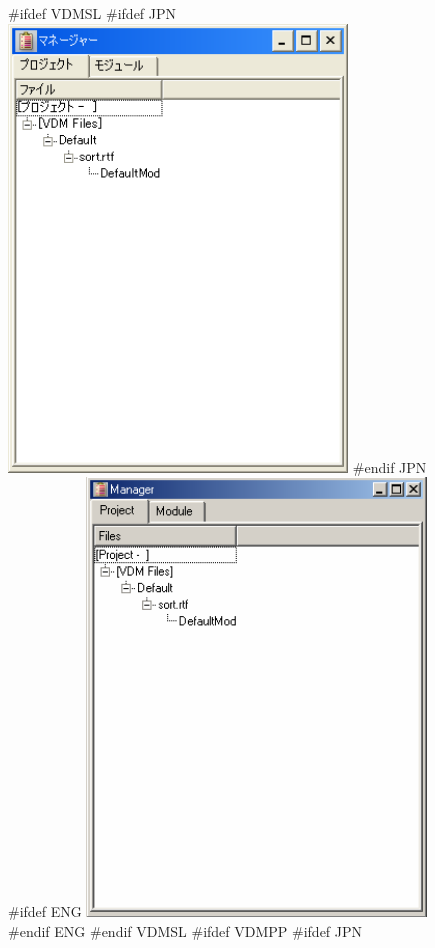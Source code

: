 \documentclass[\pformat,12pt]{article}
\begin{document}
\begin{figure}[tbh]
\begin{center}
\mbox{}
#ifdef VDMSL
#ifdef JPN
\includegraphics[width=9cm]{projectView-sl.png}
#endif JPN
#ifdef ENG
\includegraphics[width=9cm]{projectView-slENG.png}
#endif ENG
#endif VDMSL
#ifdef VDMPP
#ifdef JPN

\end{center}
\end{figure}
\end{document}
